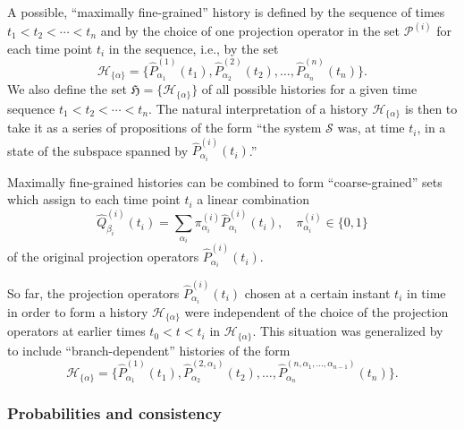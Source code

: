 \documentclass[rmp,aps,amsmath,amsfonts,noshowkeys,noshowpacs,12pt]{revtex4}
\begin{document}
A possible, ``maximally fine-grained'' history is defined by the
sequence of times $t_1 < t_2 < \cdots < t_n$ and by the choice of one
projection operator in the set $\mathcal{P}^{(i)}$ for each time point
$t_i$ in the sequence, i.e., by the set
%
\begin{equation} \label{eq:hist-fine}
\mathcal{H}_{\{\alpha\}} = \{
\widehat{P}^{(1)}_{\alpha_1}(t_1), \widehat{P}^{(2)}_{\alpha_2}(t_2),
\dots, \widehat{P}^{(n)}_{\alpha_n}(t_n) \}.  
\end{equation}
%
We also define the set $\mathfrak{H}= \{\mathcal{H}_{\{\alpha\}} \}$
of all possible histories for a given time sequence $t_1 < t_2 <
\cdots < t_n$. The natural interpretation of a history
$\mathcal{H}_{\{\alpha\}}$ is then to take it as a series of
propositions of the form ``the system $\mathcal{S}$ was, at time
$t_i$, in a state of the subspace spanned by
$\widehat{P}^{(i)}_{\alpha_i}(t_i)$.''

Maximally fine-grained histories can be combined to form
``coarse-grained'' sets which assign to each time point $t_i$ a linear
combination
%
\begin{equation} 
\widehat{Q}^{(i)}_{\beta_i}(t_i) = \sum_{\alpha_i} \pi^{(i)}_{\alpha_i}
\widehat{P}^{(i)}_{\alpha_i}(t_i), \quad \pi^{(i)}_{\alpha_i} \in \{0,1\} 
\end{equation}
%
of the original projection operators $\widehat{P}^{(i)}_{\alpha_i}(t_i)$.

So far, the projection operators $\widehat{P}^{(i)}_{\alpha_i}(t_i)$
chosen at a certain instant $t_i$ in time in order to form a history
$\mathcal{H}_{\{\alpha\}}$ were independent of the choice of the
projection operators at earlier times $t_0 < t < t_i$ in
$\mathcal{H}_{\{\alpha\}}$. This situation was generalized by
\citet{Omnes:1988:lz,Omnes:1988:lq,Omnes:1988:zg,Omnes:1990:ww,Omnes:1992:gy}
to include ``branch-dependent'' histories of the form \citep[see
also][]{GellMann:1993:oi}
%
\begin{equation} \label{eq:hist-fine-branch}
\mathcal{H}_{\{\alpha\}} = \{
\widehat{P}^{(1)}_{\alpha_1}(t_1), \widehat{P}^{(2,\alpha_1)}_{\alpha_2}(t_2),
\dots, \widehat{P}^{(n,\alpha_1,\hdots,\alpha_{n-1})}_{\alpha_n}(t_n) \}.  
\end{equation}
%


\subsubsection{Probabilities and consistency} 
\end{document}
